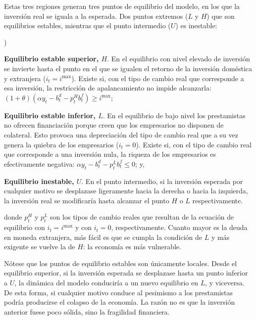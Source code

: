 \documentclass[10pt,a4paper]{article}
\newcounter{alphaitem}
\newenvironment{la}
      {\begin{list}{\alph{alphaitem})}{%
          \usecounter{alphaitem}%
          \setlength{\leftmargin}{1cm}%
          \setlength{\parskip}{3pt}%
          \setlength{\itemsep}{0pt}%
          \setlength{\parsep}{0pt}%
      }}
      {\end{list}}
\begin{document}
Estas tres regiones generan tres puntos de equilibrio del modelo, en los que la inversión real se iguala a la esperada. Dos puntos extremos ($L$ y $H$) que son equilibrios estables, mientras que el punto intermedio ($U$) es inestable:
\begin{la}
    \item \textbf{Equilibrio estable superior, $H$}. En el equilibrio con nivel elevado de inversión se invierte hasta el punto en el que se igualen el retorno de la inversión doméstica y extranjera ($i_t=i^{\max}$). Existe si, con el tipo de cambio real que corresponde a esa inversión, la restricción de apalancamiento no impide alcanzarla: $(1+\theta)\left(\alpha y_t-b_t^d-p_t^Hb_t^f\right)\geq i^{\max}$;
    \item \textbf{Equilibrio estable inferior, $L$}. En el equilibrio de bajo nivel los prestamistas no ofrecen financiación porque creen que los empresarios no disponen de colateral. Esto provoca una depreciación del tipo de cambio real que a su vez genera la quiebra de los empresarios ($i_t=0$). Existe si, con el tipo de cambio real que corresponde a una inversión nula, la riqueza de los empresarios es efectivamente negativa: $\alpha y_t-b_t^d-p_t^Lb_t^f\leq 0$; y,
    \item \textbf{Equilibrio inestable, $U$}. En el punto intermedio, si la inversión esperada por cualquier motivo se desplazase ligeramente hacia la derecha o hacia la izquierda, la inversión real se modificaría hasta alcanzar el punto $H$ o $L$ respectivamente.
\end{la}

donde $p_t^H$ y $p_t^L$ son los tipos de cambio reales que resultan de la ecuación de equilibrio con $i_t=i^{\max}$ y con $i_t=0$, respectivamente. Cuanto mayor es la deuda en moneda extranjera, más fácil es que se cumpla la condición de $L$ y más exigente se vuelve la de $H$: la economía es más vulnerable.

Nótese que los puntos de equilibrio estables son únicamente locales. Desde el equilibrio superior, si la inversión esperada se desplazase hasta un punto inferior a $U$, la dinámica del modelo conduciría a un nuevo equilibrio en $L$, y viceversa. De esta forma, si cualquier motivo conduce al pesimismo a los prestamistas podría producirse el colapso de la economía. La razón no es que la inversión anterior fuese poco sólida, sino la fragilidad financiera.
\end{document}
